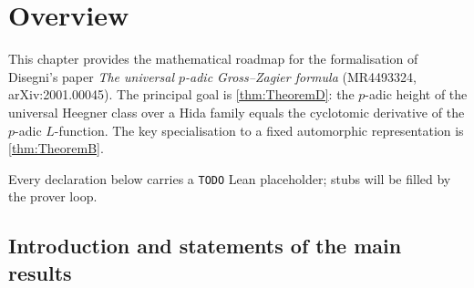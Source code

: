 \chapter{Overview}
\label{chap:overview}


\providecommand{\cP}{\mathscr{P}}
\providecommand{\cV}{\mathscr{V}}
\providecommand{\cX}{\mathscr{X}}
\providecommand{\cK}{\mathscr{K}}
\providecommand{\cQ}{\mathscr{Q}}
\providecommand{\cE}{\mathscr{E}}
\providecommand{\cL}{\mathscr{L}}
\providecommand{\cN}{\mathscr{N}}
\providecommand{\cW}{\mathscr{W}}
\providecommand{\scO}{\mathscr{O}}   %
\providecommand{\GF}{\Gamma_F}
\providecommand{\bQ}{\mathbf{Q}}
\providecommand{\bZ}{\mathbf{Z}}
\providecommand{\bA}{\mathbf{A}}
\providecommand{\bB}{\mathbf{B}}
\providecommand{\bG}{\mathrm{G}}
\providecommand{\bH}{\mathrm{H}}
\providecommand{\bZ}{\mathbf{Z}}
\providecommand{\Res}{\mathrm{Res}}
\providecommand{\ord}{\mathrm{ord}}
\providecommand{\Sg}{\Sigma}
\providecommand{\nek}{Nekov\'{a}\v{r}}
\providecommand{\tH}{\widetilde{H}}


This chapter provides the mathematical roadmap for the formalisation of
Disegni's paper \emph{The universal $p$-adic Gross--Zagier formula}
(MR4493324, arXiv:2001.00045).  The principal goal is
\cref{thm:TheoremD}: the $p$-adic height of the universal Heegner class
over a Hida family equals the cyclotomic derivative of the $p$-adic
$L$-function.  The key specialisation to a fixed automorphic
representation is \cref{thm:TheoremB}.

Every declaration below carries a \texttt{TODO} Lean placeholder;
stubs will be filled by the prover loop.

\section{Introduction and statements of the main results}

